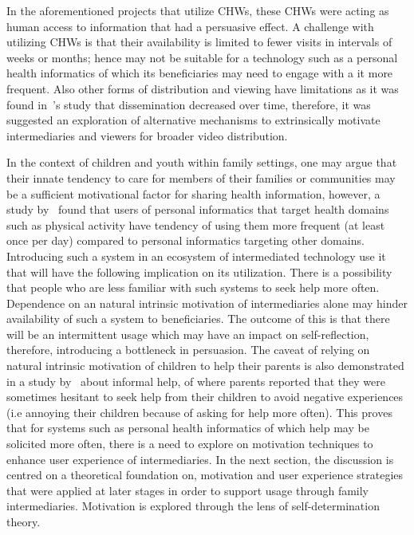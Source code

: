 In the aforementioned projects that utilize CHWs, these CHWs were acting as human access to information that had a persuasive effect. A challenge with utilizing CHWs is that their availability is limited to fewer visits in intervals of weeks or months; hence may not be suitable for a technology such as a personal health informatics of which its beneficiaries may need to engage with a it more frequent. Also other forms of distribution and viewing have limitations as it was found in~\cite{vashistha2016mobile}'s study that dissemination decreased over time, therefore, it was  suggested an exploration of alternative mechanisms  to extrinsically motivate intermediaries and viewers for broader video distribution.

In the context of children and youth within family settings, one may argue that their innate tendency to care for members of their families or communities may be a sufficient motivational factor for sharing health information, however, a study by~\cite{epstein2015lived} found that users of personal informatics that target health domains such as physical activity have tendency of using them more frequent (at least once per day) compared to personal informatics targeting other domains. Introducing such a system in an ecosystem of intermediated technology use it that will have the following implication on its utilization. There is a possibility that people who are less familiar with such systems to seek help more often. Dependence on  an natural intrinsic motivation of intermediaries alone may hinder availability of such a system to beneficiaries. The outcome of this is that there will be an intermittent usage which may have an impact on self-reflection, therefore, introducing a bottleneck in persuasion. The caveat of relying on natural intrinsic motivation of children to help their parents is also demonstrated in a study by~\cite{kiesler:twi} about informal help, of where parents reported that they were sometimes hesitant to seek help from their children to avoid negative experiences (i.e annoying their children because of asking for help more often). This proves that for systems such as personal health informatics of which help may be solicited more often, there is a need to explore on motivation techniques to enhance user experience of intermediaries. In the next section, the discussion is centred on a theoretical foundation on, motivation and user experience strategies that were applied at later stages in order to support usage through family intermediaries. Motivation is explored through the lens of self-determination theory.
